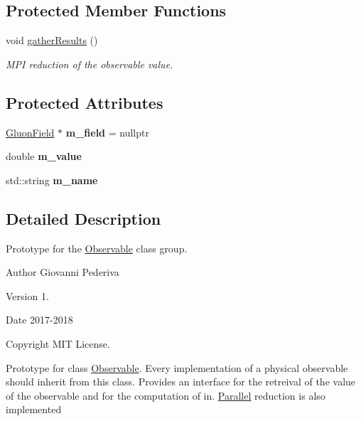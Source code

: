 \subsection*{Protected Member Functions}
\begin{DoxyCompactItemize}
\item 
void \hyperlink{classObservable_ae42f1c4bf6362dde45f8f6e8042f2ff5}{gather\+Results} ()\hypertarget{classObservable_ae42f1c4bf6362dde45f8f6e8042f2ff5}{}\label{classObservable_ae42f1c4bf6362dde45f8f6e8042f2ff5}

\begin{DoxyCompactList}\small\item\em M\+PI reduction of the observable value. \end{DoxyCompactList}\end{DoxyCompactItemize}
\subsection*{Protected Attributes}
\begin{DoxyCompactItemize}
\item 
\hyperlink{field_8h_afe80b127697eba6d6e7fbd8121c8d4ee}{Gluon\+Field} $\ast$ {\bfseries m\+\_\+field} = nullptr\hypertarget{classObservable_a3f3b97a6ccf3662fc4285e0249fc7e55}{}\label{classObservable_a3f3b97a6ccf3662fc4285e0249fc7e55}

\item 
double {\bfseries m\+\_\+value}\hypertarget{classObservable_a65689c61e83937902110f9da43b4a327}{}\label{classObservable_a65689c61e83937902110f9da43b4a327}

\item 
std\+::string {\bfseries m\+\_\+name}\hypertarget{classObservable_ac48d8fce3be9fefa7af3bb3cd4e01e06}{}\label{classObservable_ac48d8fce3be9fefa7af3bb3cd4e01e06}

\end{DoxyCompactItemize}


\subsection{Detailed Description}
Prototype for the \hyperlink{classObservable}{Observable} class group. 

\begin{DoxyAuthor}{Author}
Giovanni Pederiva 
\end{DoxyAuthor}
\begin{DoxyVersion}{Version}
1. 
\end{DoxyVersion}
\begin{DoxyDate}{Date}
2017-\/2018 
\end{DoxyDate}
\begin{DoxyCopyright}{Copyright}
M\+IT License.
\end{DoxyCopyright}
Prototype for class \hyperlink{classObservable}{Observable}. Every implementation of a physical observable should inherit from this class. Provides an interface for the retreival of the value of the observable and for the computation of in. \hyperlink{classParallel}{Parallel} reduction is also implemented 

